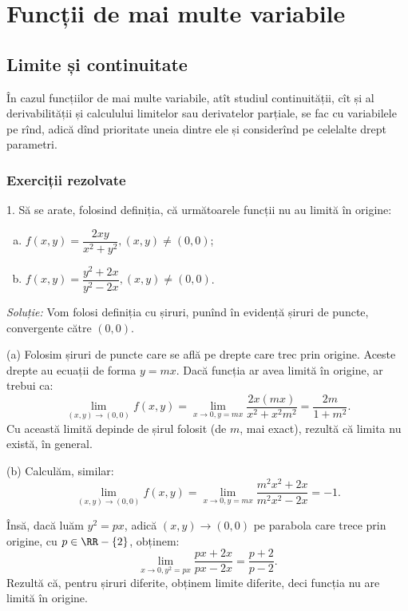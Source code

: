 
\chapter{Funcții de mai multe variabile}

\section{Limite și continuitate}

În cazul funcțiilor de mai multe variabile, atît studiul continuității,
cît și al derivabilității și calculului limitelor sau derivatelor
parțiale, se fac cu variabilele pe rînd, adică dînd prioritate
uneia dintre ele și considerînd pe celelalte drept parametri.

\subsection{Exerciții rezolvate}

1. Să se arate, folosind definiția, că următoarele funcții nu au limită în origine:
\begin{enumerate}[(a)]
\item $f(x, y) = \dfrac{2xy}{x^2 + y^2}, (x, y) \neq (0, 0)$;
\item $f(x, y) = \dfrac{y^2 + 2x}{y^2 - 2x}, (x, y) \neq (0, 0)$.
\end{enumerate}

\emph{Soluție:} Vom folosi definiția cu șiruri, punînd în evidență șiruri de puncte,
convergente către $(0, 0)$.

(a) Folosim șiruri de puncte care se află pe drepte care trec prin origine. Aceste drepte
au ecuații de forma $y = mx$. Dacă funcția ar avea limită în origine, ar trebui ca:
\[
  \lim_{(x, y) \to (0, 0)} f(x, y) = \lim_{x \to 0, y = mx} \frac{2x(mx)}{x^2 + x^2 m^2} = %
  \frac{2m}{1 + m^2}.
\]
Cu această limită depinde de șirul folosit (de $m$, mai exact), rezultă că limita nu
există, în general.

(b) Calculăm, similar:
\[
  \lim_{(x, y) \to (0, 0)} f(x, y) = %
  \lim_{x \to 0, y = mx} \frac{m^2 x^2 + 2x}{m^2 x^2 - 2x} = -1.
\]

Însă, dacă luăm $y^2 = px$, adică $(x, y) \to (0, 0)$ pe parabola care trece prin origine,
cu $p \in \RR - \{2 \}$, obținem:
\[
  \lim_{x \to 0, y^2 = px} \frac{px + 2x}{px - 2x} = \frac{p + 2}{p - 2}.
\]
Rezultă că, pentru șiruri diferite, obținem limite diferite, deci funcția nu are limită
în origine.

